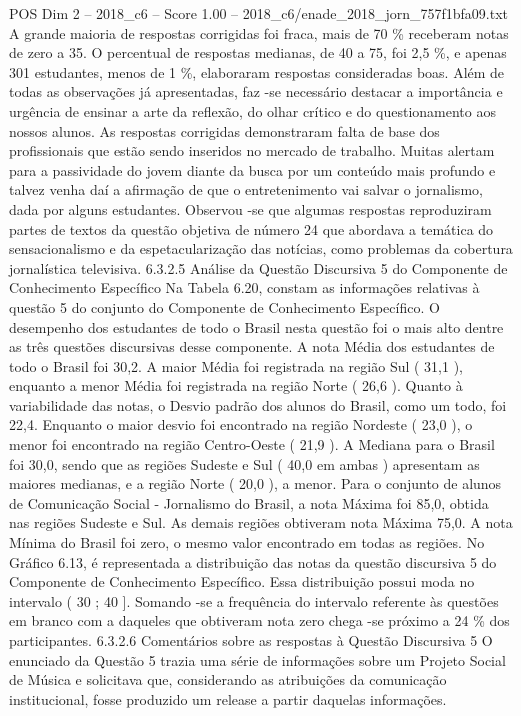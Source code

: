 \begin{textsample}{POS Dim 2 – 2018\_c6 – Score 1.00 – 2018\_c6/enade\_2018\_jorn\_757f1bfa09.txt}
A grande maioria de respostas corrigidas foi fraca, mais de 70 \% receberam notas de zero a 35.
O percentual de respostas medianas, de 40 a 75, foi 2,5 \%, e apenas 301 estudantes, menos de 1 \%, elaboraram respostas consideradas boas.
Além de todas as observações já apresentadas, faz -se necessário destacar a importância e urgência de ensinar a arte da reflexão, do olhar crítico e do questionamento aos nossos alunos.
As respostas corrigidas demonstraram falta de base dos profissionais que estão sendo inseridos no mercado de trabalho.
Muitas alertam para a passividade do jovem diante da busca por um conteúdo mais profundo e talvez venha daí a afirmação de que o entretenimento vai salvar o jornalismo, dada por alguns estudantes.
Observou -se que algumas respostas reproduziram partes de textos da questão objetiva de número 24 que abordava a temática do sensacionalismo e da espetacularização das notícias, como problemas da cobertura jornalística televisiva. 6.3.2.5 Análise da Questão Discursiva 5 do Componente de Conhecimento Específico Na Tabela 6.20, constam as informações relativas à questão 5 do conjunto do Componente de Conhecimento Específico.
O desempenho dos estudantes de todo o Brasil nesta questão foi o mais alto dentre as três questões discursivas desse componente.
A nota Média dos estudantes de todo o Brasil foi 30,2.
A maior Média foi registrada na região Sul ( 31,1 ), enquanto a menor Média foi registrada na região Norte ( 26,6 ).
Quanto à variabilidade das notas, o Desvio padrão dos alunos do Brasil, como um todo, foi 22,4.
Enquanto o maior desvio foi encontrado na região Nordeste ( 23,0 ), o menor foi encontrado na região Centro-Oeste ( 21,9 ).
A Mediana para o Brasil foi 30,0, sendo que as regiões Sudeste e Sul ( 40,0 em ambas ) apresentam as maiores medianas, e a região Norte ( 20,0 ), a menor.
Para o conjunto de alunos de Comunicação Social - Jornalismo do Brasil, a nota Máxima foi 85,0, obtida nas regiões Sudeste e Sul.
As demais regiões obtiveram nota Máxima 75,0.
A nota Mínima do Brasil foi zero, o mesmo valor encontrado em todas as regiões.
No Gráfico 6.13, é representada a distribuição das notas da questão discursiva 5 do Componente de Conhecimento Específico.
Essa distribuição possui moda no intervalo ( 30 ; 40 ].
Somando -se a frequência do intervalo referente às questões em branco com a daqueles que obtiveram nota zero chega -se próximo a 24 \% dos participantes. 6.3.2.6 Comentários sobre as respostas à Questão Discursiva 5 O enunciado da Questão 5 trazia uma série de informações sobre um Projeto Social de Música e solicitava que, considerando as atribuições da comunicação institucional, fosse produzido um release a partir daquelas informações.

\end{textsample}
